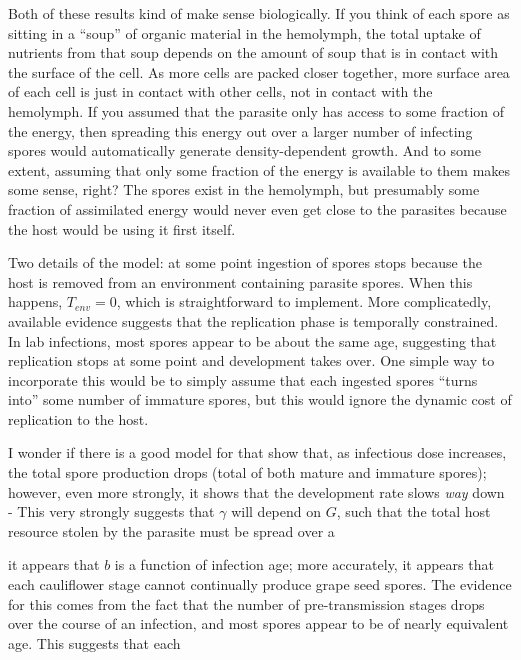 \documentclass[11pt,reqno,final,pdftex]{amsart}\usepackage[]{graphicx}\usepackage[]{color}
\theoremstyle{plain}
\numberwithin{equation}{part}
\begin{document}
Both of these results kind of make sense biologically.
If you think of each spore as sitting in a ``soup'' of organic material in the hemolymph, the total uptake of nutrients from that soup depends on the amount of soup that is in contact with the surface of the cell.
As more cells are packed closer together, more surface area of each cell is just in contact with other cells, not in contact with the hemolymph.
If you assumed that the parasite only has access to some fraction of the energy, then spreading this energy out over a larger number of infecting spores would automatically generate density-dependent growth.
And to some extent, assuming that only some fraction of the energy is available to them makes some sense, right? The spores exist in the hemolymph, but presumably some fraction of assimilated energy would never even get close to the parasites because the host would be using it first itself.

Two details of the model: at some point ingestion of spores stops because the host is removed from an environment containing parasite spores.
When this happens, $T_{env} = 0$, which is straightforward to implement.
More complicatedly, available evidence suggests that the replication phase is temporally constrained.
In lab infections, most spores appear to be about the same age, suggesting that replication stops at some point and development takes over.
One simple way to incorporate this would be to simply assume that each ingested spores ``turns into'' some number of immature spores, but this would ignore the dynamic cost of replication to the host.


I wonder if there is a good model for that
show that, as infectious dose increases, the total spore production drops (total of both mature and immature spores); however, even more strongly, it shows that the development rate slows \emph{way} down -
This very strongly suggests that $\gamma$ will depend on $G$, such that the total host resource stolen by the parasite must be spread over a

it appears that $b$ is a function of infection age; more accurately, it appears that each cauliflower stage cannot continually produce grape seed spores.
The evidence for this comes from the fact that the number of pre-transmission stages drops over the course of an infection, and most spores appear to be of nearly equivalent age.
This suggests that each
\end{document}

